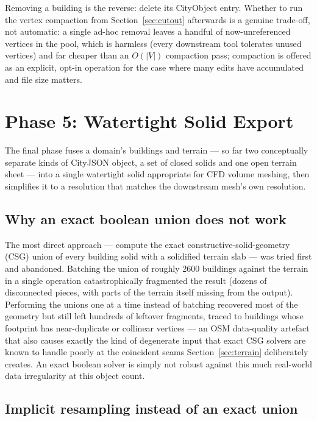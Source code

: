 \documentclass[11pt]{article}
\begin{document}
Removing a building is the reverse: delete its CityObject entry. Whether to run the vertex
compaction from Section~\ref{sec:cutout} afterwards is a genuine trade-off, not automatic: a
single ad-hoc removal leaves a handful of now-unreferenced vertices in the pool, which is
harmless (every downstream tool tolerates unused vertices) and far cheaper than an $O(|V|)$
compaction pass; compaction is offered as an explicit, opt-in operation for the case where many
edits have accumulated and file size matters.

\section{Phase 5: Watertight Solid Export}
\label{sec:solid}

The final phase fuses a domain's buildings and terrain --- so far two conceptually separate
kinds of CityJSON object, a set of closed solids and one open terrain sheet --- into a single
watertight solid appropriate for CFD volume meshing, then simplifies it to a resolution that
matches the downstream mesh's own resolution.

\subsection{Why an exact boolean union does not work}

The most direct approach --- compute the exact constructive-solid-geometry (CSG) union of
every building solid with a solidified terrain slab --- was tried first and abandoned. Batching
the union of roughly 2600 buildings against the terrain in a single operation catastrophically
fragmented the result (dozens of disconnected pieces, with parts of the terrain itself missing
from the output). Performing the unions one at a time instead of batching recovered most of
the geometry but still left hundreds of leftover fragments, traced to buildings whose footprint
has near-duplicate or collinear vertices --- an OSM data-quality artefact that also causes
exactly the kind of degenerate input that exact CSG solvers are known to handle poorly at the
coincident seams Section~\ref{sec:terrain} deliberately creates. An exact boolean solver is
simply not robust against this much real-world data irregularity at this object count.

\subsection{Implicit resampling instead of an exact union}
\end{document}
